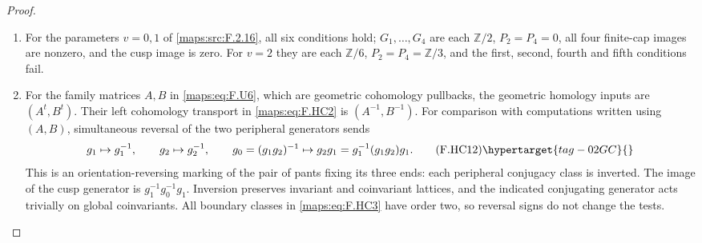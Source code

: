 \begin{proof}
\begin{enumerate}[label={$\langle1\rangle$\arabic*.}]
\item For the parameters $v=0,1$ of \ref{maps:src:F.2.16}, all six
conditions hold;
$G_1,\ldots,G_4$ are each $\mathbb Z/2$,
$P_2=P_4=0$, all four finite-cap images are nonzero,
and the cusp image is zero.
For $v=2$ they are each $\mathbb Z/6$,
$P_2=P_4=\mathbb Z/3$, and the first, second,
fourth and fifth conditions fail.

\item For the family matrices $A,B$ in \eqref{maps:eq:F.U6}, which
are geometric cohomology pullbacks, the geometric homology inputs
are $(A^t,B^t)$. Their left cohomology transport in
\eqref{maps:eq:F.HC2} is $(A^{-1},B^{-1})$.
For comparison with computations written using
$(A,B)$, simultaneous reversal of the two peripheral
generators sends
\[
 g_1\mapsto g_1^{-1},\qquad
 g_2\mapsto g_2^{-1},\qquad
 g_0=(g_1g_2)^{-1}\mapsto
     g_2g_1=g_1^{-1}(g_1g_2)g_1 .
 \tag{F.HC12}\hypertarget{tag-02GC}{}\label{maps:eq:F.HC12}
\]
This is an orientation-reversing marking of the
pair of pants fixing its three ends: each peripheral
conjugacy class is inverted.
The image of the cusp generator is $g_1^{-1}g_0^{-1}g_1$.
Inversion preserves invariant and coinvariant
lattices, and the indicated conjugating generator
acts trivially on global coinvariants.
All boundary classes in \eqref{maps:eq:F.HC3} have order two, so
reversal signs do not change the tests.

\end{enumerate}
\end{proof}




